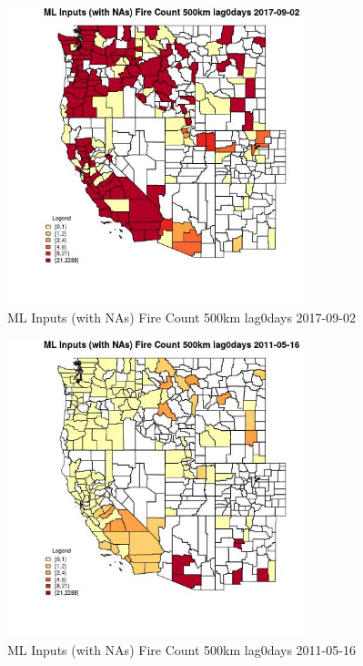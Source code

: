 \clearpage 

\begin{figure} 
\centering  
\includegraphics[width=0.77\textwidth]{Code_Outputs/Report_ML_input_PM25_Step4_part_e_de_duplicated_aves_compiled_2019-05-21wNAs_CountyFire_Count_500km_lag0daysMean2017-09-02.jpg} 
\caption{\label{fig:Report_ML_input_PM25_Step4_part_e_de_duplicated_aves_compiled_2019-05-21wNAsCountyFire_Count_500km_lag0daysMean2017-09-02}ML Inputs (with NAs) Fire Count 500km lag0days 2017-09-02} 
\end{figure} 
 

\begin{figure} 
\centering  
\includegraphics[width=0.77\textwidth]{Code_Outputs/Report_ML_input_PM25_Step4_part_e_de_duplicated_aves_compiled_2019-05-21wNAs_CountyFire_Count_500km_lag0daysMean2011-05-16.jpg} 
\caption{\label{fig:Report_ML_input_PM25_Step4_part_e_de_duplicated_aves_compiled_2019-05-21wNAsCountyFire_Count_500km_lag0daysMean2011-05-16}ML Inputs (with NAs) Fire Count 500km lag0days 2011-05-16} 
\end{figure} 
 

